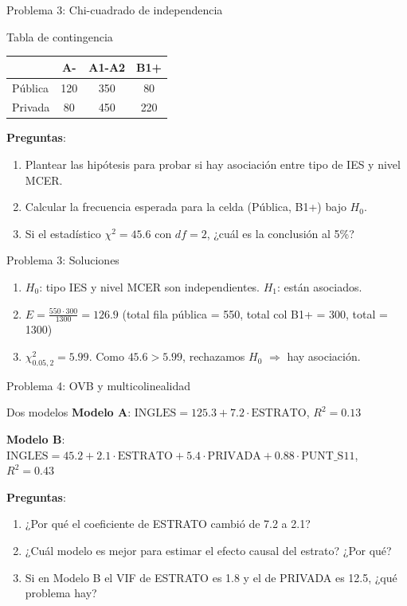 \documentclass[aspectratio=169, 11pt]{beamer}
\begin{document}
\begin{frame}{Problema 3: Chi-cuadrado de independencia}
\begin{exampleblock}{Tabla de contingencia}
\begin{center}
\begin{tabular}{lccc}
\toprule
 & \textbf{A-} & \textbf{A1-A2} & \textbf{B1+} \\
\midrule
Pública & 120 & 350 & 80 \\
Privada & 80 & 450 & 220 \\
\bottomrule
\end{tabular}
\end{center}
\end{exampleblock}

\textbf{Preguntas}:
\begin{enumerate}
\item Plantear las hipótesis para probar si hay asociación entre tipo de IES y nivel MCER.
\item Calcular la frecuencia esperada para la celda (Pública, B1+) bajo $H_0$.
\item Si el estadístico $\chi^2 = 45.6$ con $df = 2$, ¿cuál es la conclusión al 5\%?
\end{enumerate}
\end{frame}

\begin{frame}{Problema 3: Soluciones}
\begin{enumerate}
\item $H_0$: tipo IES y nivel MCER son independientes. $H_1$: están asociados.
\item $E = \frac{550 \cdot 300}{1300} = 126.9$ (total fila pública = 550, total col B1+ = 300, total = 1300)
\item $\chi^2_{0.05, 2} = 5.99$. Como $45.6 > 5.99$, rechazamos $H_0$ $\Rightarrow$ hay asociación.
\end{enumerate}
\end{frame}

\begin{frame}{Problema 4: OVB y multicolinealidad}
\begin{exampleblock}{Dos modelos}
\small
\textbf{Modelo A}: $\text{INGLES} = 125.3 + 7.2 \cdot \text{ESTRATO}$, $R^2 = 0.13$

\textbf{Modelo B}: $\text{INGLES} = 45.2 + 2.1 \cdot \text{ESTRATO} + 5.4 \cdot \text{PRIVADA} + 0.88 \cdot \text{PUNT\_S11}$, $R^2 = 0.43$
\end{exampleblock}

\textbf{Preguntas}:
\begin{enumerate}
\item ¿Por qué el coeficiente de ESTRATO cambió de 7.2 a 2.1?
\item ¿Cuál modelo es mejor para estimar el efecto causal del estrato? ¿Por qué?
\item Si en Modelo B el VIF de ESTRATO es 1.8 y el de PRIVADA es 12.5, ¿qué problema hay?
\end{enumerate}
\end{frame}
\end{document}
